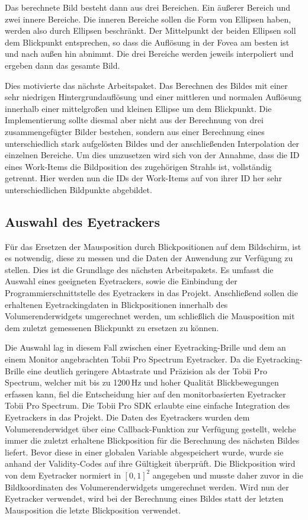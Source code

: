 Das berechnete Bild besteht dann aus drei Bereichen.
Ein äußerer Bereich und zwei innere Bereiche.
Die inneren Bereiche sollen die Form von Ellipsen haben, werden also durch Ellipsen beschränkt.
Der Mittelpunkt der beiden Ellipsen soll dem Blickpunkt entsprechen, so dass die Auflösung in der Fovea am besten ist und nach außen hin abnimmt.
Die drei Bereiche werden jeweils interpoliert und ergeben dann das gesamte Bild.

Dies motivierte das nächste Arbeitspaket.
Das Berechnen des Bildes mit einer sehr niedrigen Hintergrundauflösung und einer mittleren und normalen Auflösung innerhalb einer mittelgroßen und kleinen Ellipse um dem Blickpunkt.
Die Implementierung sollte diesmal aber nicht aus der Berechnung von drei zusammengefügter Bilder bestehen, sondern aus einer Berechnung eines unterschiedlich stark aufgelösten Bildes und der anschließenden Interpolation der einzelnen Bereiche.
Um dies umzusetzen wird sich von der Annahme, dass die ID eines Work-Items die Bildposition des zugehörigen Strahls ist, vollständig getrennt.
Hier werden nun die IDs der Work-Items auf von ihrer ID her sehr unterschiedlichen Bildpunkte abgebildet.

\subsection{Auswahl des Eyetrackers}
Für das Ersetzen der Mausposition durch Blickpositionen auf dem Bildschirm, ist es notwendig, diese zu messen und die Daten der Anwendung zur Verfügung zu stellen.
Dies ist die Grundlage des nächsten Arbeitspakets.
Es umfasst die Auswahl eines geeigneten Eyetrackers, sowie die Einbindung der Programmierschnittstelle des Eyetrackers in das Projekt.
Anschließend sollen die erhaltenen Eyetrackingdaten in Blickpositionen innerhalb des Volumerenderwidgets umgerechnet werden, um schließlich die Mausposition mit dem zuletzt gemessenen Blickpunkt zu ersetzen zu können.

Die Auswahl lag in diesem Fall zwischen einer Eyetracking-Brille und dem an einem Monitor angebrachten Tobii Pro Spectrum Eyetracker.
Da die Eyetracking-Brille eine deutlich geringere Abtastrate und Präzision als der Tobii Pro Spectrum, welcher mit bis zu 1200\,Hz und hoher Qualität Blickbewegungen erfassen kann, fiel die Entscheidung hier auf den monitorbasierten Eyetracker Tobii Pro Spectrum.
Die Tobii Pro SDK erlaubte eine einfache Integration des Eyetrackers in das Projekt.
Die Daten des Eyetrackers wurden dem Volumerenderwidget über eine Callback-Funktion zur Verfügung gestellt, welche immer die zuletzt erhaltene Blickposition für die Berechnung des nächsten Bildes liefert.
Bevor diese in einer globalen Variable abgespeichert wurde, wurde sie anhand der Validity-Codes auf ihre Gültigkeit überprüft.
Die Blickposition wird von dem Eyetracker normiert in $[0,1]^2$ angegeben und musste daher zuvor in die Bildkoordinaten des Volumerenderwidgets umgerechnet werden.
Wird nun der Eyetracker verwendet, wird bei der Berechnung eines Bildes statt der letzten Mausposition die letzte Blickposition verwendet.

